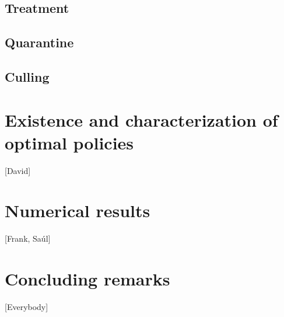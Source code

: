 \documentclass[a4paper]{amsart}
\begin{document}
	    \subsection{Treatment}
	    	
	    	
	    \subsection{Quarantine}
	    	
	    \subsection{Culling}
	    	
	\section{Existence and characterization of optimal policies}
		[David]
	\section{Numerical results}
		[Frank, Saúl]
	\section{Concluding remarks}
		[Everybody]
%
	
	
\end{document}
